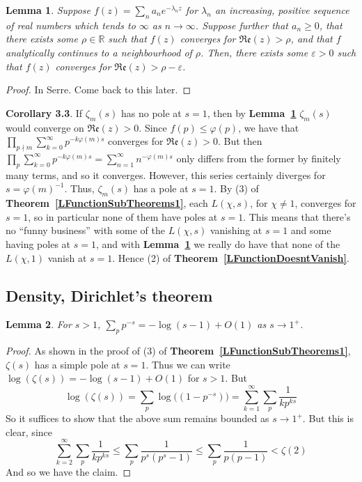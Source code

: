 \documentclass[12pt]{article}
\newcommand{\reals}{\mathbb{R}}
\newcommand{\lref}[1]{\textbf{Lemma~\ref{#1}}}
\newcommand{\tref}[1]{\textbf{Theorem~\ref{#1}}}
\newtheorem{lemma}{Lemma}
\numberwithin{equation}{section}
\numberwithin{thm}{section}
\numberwithin{lemma}{section}
\numberwithin{cor}{section}
\begin{document}
\begin{lemma}\label{AnalyticContinuationImpliesCovergence}
  Suppose $f(z) = \sum_n a_n e^{-\lambda_n z}$ for $\lambda_n$ an increasing, positive sequence of real numbers which tends to $\infty$ as $n \to \infty$. Suppose further that $a_n \geq 0$, that there exists some $\rho \in \reals$ such that $f(z)$ converges for $\mathfrak{Re}(z) > \rho$, and that $f$ analytically continues to a neighbourhood of $\rho$. Then, there exists some $\varepsilon > 0$ such that $f(z)$ converges for $\mathfrak{Re}(z) > \rho - \varepsilon$.
\end{lemma}
\begin{proof}
  In Serre. Come back to this later.
\end{proof}

\textbf{Corollary 3.3}. If $\zeta_m(s)$ has no pole at $s = 1$, then by \lref{AnalyticContinuationImpliesCovergence} $\zeta_m(s)$ would converge on $\mathfrak{Re}(z) > 0$. Since $f(p)\leq \varphi(p)$, we have that $\prod_{p \nmid m} \sum_{k=0}^{\infty} p^{-k\varphi(m) s}$ converges for $\mathfrak{Re}(z) > 0$. But then $\prod_p \sum_{k=0}^{\infty} p^{-k\varphi(m)s} = \sum_{n=1}^{\infty} n^{-\varphi(m)s}$ only differs from the former by finitely many terms, and so it converges. However, this series certainly diverges for $s = \varphi(m)^{-1}$. Thus, $\zeta_m(s)$ has a pole at $s = 1$. By (3) of \tref{LFunctionSubTheorems1}, each $L(\chi, s)$, for $\chi \ne 1$, converges for $s = 1$, so in particular none of them have poles at $s = 1$. This means that there's no ``funny business'' with some of the $L(\chi, s)$ vanishing at $s = 1$ and some having poles at $s = 1$, and with \lref{AnalyticContinuationImpliesCovergence} we really do have that none of the $L(\chi, 1)$ vanish at $s = 1$. Hence (2) of \tref{LFunctionDoesntVanish}.

\subsection{Density, Dirichlet's theorem}

\begin{lemma}\label{ZetaIsLogPlusBounded}
  For $s > 1$, $\sum_p p^{-s} = -\log (s-1) + O(1)$ as $s \to 1^+$.
\end{lemma}
\begin{proof}
  As shown in the proof of (3) of \tref{LFunctionSubTheorems1}, $\zeta(s)$ has a simple pole at $s = 1$. Thus we can write $\log (\zeta(s)) = - \log(s-1) + O(1)$ for $s > 1$. But \begin{equation*}
    \log(\zeta(s)) = \sum_p \log \Big( (1 - p^{-s}) \Big) = \sum_{k = 1}^{\infty} \sum_p \frac{1}{kp^{ks}}
  \end{equation*} So it suffices to show that the above sum remains bounded as $s \to 1^+$. But this is clear, since \begin{equation*}
    \sum_{k=2}^{\infty} \sum_p \frac{1}{kp^{ks}} \leq \sum_p \frac{1}{p^s (p^s - 1)} \leq \sum_p \frac{1}{p(p-1)} < \zeta(2)
  \end{equation*} And so we have the claim.
\end{proof}
\end{document}

